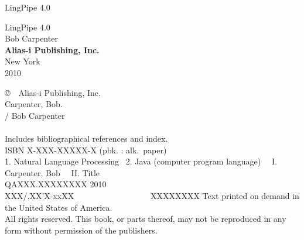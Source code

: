 \documentclass[10pt]{book}
\newcommand{\bookname}{LingPipe 4.0}
\begin{document}
\setcounter{chapter}{0}
\setcounter{section}{0}
\pagestyle{empty}

\cleardoublepage
\vspace*{2.375in}
\begin{center}
{\hfill {\Huge \bookname}}
\end{center}


\cleardoublepage
\vspace*{1.125in}
\begin{center}
{\hfill {\fontsize{70}{100}\selectfont \bookname}}
\\[0.75in]
{\hfill {\Huge Bob Carpenter}}
\\[-1pt]
\vfill
{\hfill {\large\bf Alias-i Publishing, Inc.}}
\\[1pt]
{\hfill {\small New York}}
\\[-1pt]
{\hfill {\small 2010}}
\end{center}

\clearpage
\vspace*{1.25in}
\noindent
{\footnotesize%
\copyright \ \ Alias-i Publishing, Inc.
\hfill
\vfill
\vfill
{}
\\[6pt]
Carpenter, Bob.
\\
\hspace*{0.125in}{\it \bookname} / Bob Carpenter
\\
\hspace*{.5in}{p. cm.}
\\
\hspace*{0.125in}Includes bibliographical references and index.
\\
\hspace*{0.125in}ISBN X-XXX-XXXXX-X (pbk. : alk.~paper)
\\[4pt]
1. Natural Language Processing  \ 2. Java (computer program language) \ \ I. Carpenter, Bob \ \ II. Title
\\[2pt]
\hspace*{0.125in}QAXXX.XXXXXXXX 2010
\\[2pt]
\hspace*{0.125in}XXX/.XX'X-xxXX      \ \ \ \ \ \ \ \ \ \ \ \ \ \ \ \ \  \ XXXXXXXX
\vfill
\noindent
Text printed on demand in the United States of America.
\\[12pt]
All rights reserved. This book, or parts thereof, may not
be reproduced in any form without permission of the publishers.
}
\end{document}

